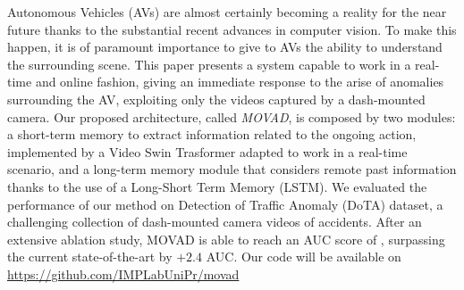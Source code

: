 Autonomous Vehicles (AVs) are almost certainly becoming a reality for the near future thanks to the substantial recent advances in computer vision.
To make this happen, it is of paramount importance to give to AVs the ability to understand the surrounding scene.
This paper presents a system capable to work in a real-time and online fashion, giving an immediate response to the arise of anomalies surrounding the AV, exploiting only the videos captured by a dash-mounted camera.
Our proposed architecture, called \emph{MOVAD}, is composed by two modules: a short-term memory to extract information related to the ongoing action, implemented by a Video Swin Trasformer adapted to work in a real-time scenario, and a long-term memory module that considers remote past information thanks to the use of a Long-Short Term Memory (LSTM).
We evaluated the performance of our method on Detection of Traffic Anomaly (DoTA) dataset, a challenging collection of dash-mounted camera videos of accidents.
After an extensive ablation study, MOVAD is able to reach an AUC score of , surpassing the current state-of-the-art by $+2.4$ AUC.
Our code will be available on \url{https://github.com/IMPLabUniPr/movad}